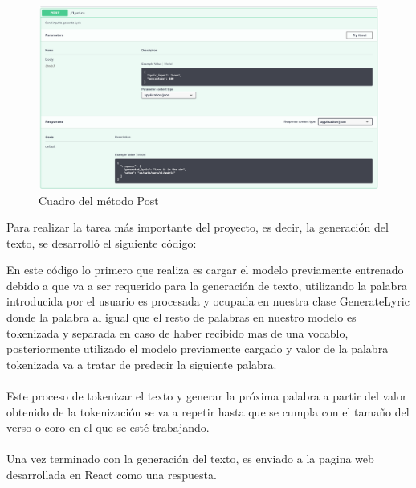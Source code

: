 \documentclass[12pt, a4paper, titlepage]{report}
\begin{document}
\begin{figure}[H]
	\includegraphics[width=13.5cm]{./imagenes/Desarrollo/BackEnd/Post.png}
	\centering 
	\caption{Cuadro del método Post}
\end{figure}
Para realizar la tarea más importante del proyecto, es decir, la generación del texto, se desarrolló el siguiente código:
\newpage
\begin{center}
	
\end{center}
En este código lo primero que realiza es cargar el modelo previamente entrenado debido a que va a ser requerido para la generación de texto, utilizando la palabra introducida por el usuario es procesada y ocupada en nuestra clase GenerateLyric donde la palabra al igual que el resto de palabras en nuestro modelo es tokenizada y separada en caso de haber recibido mas de una vocablo, posteriormente utilizado el modelo previamente cargado y valor de la palabra tokenizada va a tratar de predecir la siguiente palabra.\\\\
Este proceso de tokenizar el texto y generar la próxima palabra a partir del valor obtenido de la tokenización se va a repetir hasta que se cumpla con el tamaño del verso o coro en el que se esté trabajando.\\\\
Una vez terminado con la generación del texto, es enviado a la pagina web desarrollada en React como una respuesta.

\newpage
\end{document}
